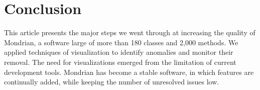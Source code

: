 \documentclass[runningheads]{llncs}
\newcommand{\seclabel}[1]{\label{sec:#1}}
\begin{document}
%
%
%

%



%


\section{Conclusion} \seclabel{conclusion}

This article presents the major steps we went through at increasing the quality of Mondrian, a software large of more than 180 classes and 2,000 methods. We applied techniques of visualization to identify anomalies and monitor their removal. 
The need for visualizations emerged from the limitation of current development tools. 
Mondrian has become a stable software, in which features are continually added, while keeping the number of unresolved issues low.




{\small


}
\end{document}
